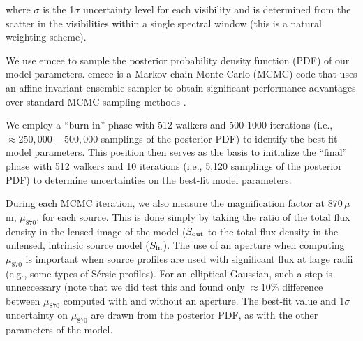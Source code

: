 \documentclass[iop]{emulateapj}
\begin{document}



\noindent where $\sigma$ is the 1$\sigma$ uncertainty level for each
visibility and is determined from the scatter in the visibilities within a
single spectral window (this is a natural weighting scheme).  

We use {\sc emcee} \citep{Foreman-Mackey:2013yq} to sample the posterior
probability density function (PDF) of our model parameters.  {\sc emcee} is a
Markov chain Monte Carlo (MCMC) code that uses an affine-invariant ensemble
sampler to obtain significant performance advantages over standard MCMC
sampling methods \citep{goodmanweare}.  

We employ a ``burn-in'' phase with 512 walkers and 500-1000 iterations (i.e.,
$\approx 250,000-500,000$ samplings of the posterior PDF) to identify the
best-fit model parameters.  This position then serves as the basis to
initialize the ``final'' phase with 512 walkers and 10 iterations (i.e., 5,120
samplings of the posterior PDF) to determine uncertainties on the best-fit
model parameters.  

During each MCMC iteration, we also measure the magnification factor at
870$\,\mu$m, $\mu_{870}$, for each source.  This is done simply by taking the
ratio of the total flux density in the lensed image of the model ($S_{\rm out}$
to the total flux density in the unlensed, intrinsic source model ($S_{\rm
in}$).  The use of an aperture when computing $\mu_{870}$ is important when
source profiles are used with significant flux at large radii (e.g., some types
of S\'ersic profiles).  For an elliptical Gaussian, such a step is unneccessary
(note that we did test this and found only $\approx 10\%$ difference between
$\mu_{870}$ computed with and without an aperture.  The best-fit value and
1$\sigma$ uncertainty on $\mu_{870}$ are drawn from the posterior PDF, as with
the other parameters of the model.
\end{document}
